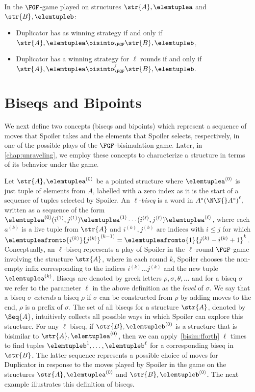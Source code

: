 \begin{corollary}
  In the $\FGF$-game played on structures $\str{A}, \elemtuplea$ and $\str{B}, \elemtupleb$:
  \begin{itemize}
    \item Duplicator has as winning strategy if and only if $\str{A}, \elemtuplea \bisimto_{\FGF} \str{B}, \elemtupleb$,
    \item Duplicator has a winning strategy for $\ell$ rounds if and only if $\str{A}, \elemtuplea \bisimto_{\FGF}^{\ell} \str{B}, \elemtupleb$.
  \end{itemize}
\end{corollary}

\section{Biseqs and Bipoints}\label{sec:biseqs-and-bipoints}
We next define two concepts (biseqs and bipoints) which represent a sequence of moves that Spoiler takes and the elements that Spoiler selects, respectively, in one of the possible plays of the $\FGF$-bisimulation game.
Later, in \cref{chap:unraveling}, we employ these concepts to characterize a structure in terms of its behavior under the game.

Let $\str{A}, \elemtuplea^{(0)}$ be a pointed structure where $\elemtuplea^{(0)}$ is just tuple of elements from $A$, labelled with a zero index as it is the start of a sequence of tuples selected by Spoiler.
An $\ell$-\emph{biseq} is a word in $A^*{(\N\N{}A^{*})}^{\ell}$, written as a sequence of the form $\elemtuplea^{(0)}(i^{(1)}, j^{(1)})\elemtuplea^{(1)}\cdots(i^{(\ell)}, j^{(\ell)})\elemtuplea^{(\ell)}$, where each $a^{(k)}$ is a live tuple from $\str{A}$ and $i^{(k)}, j^{(k)}$ are indices with $i \le j$ for which $\elemtupleafromto{i^{(k)}}{j^{(k)}}^{(k-1)} = \elemtupleafromto{1}{j^{(k)}-i^{(k)}+1}^{k}$.
Conceptually, an $\ell$-biseq represents a play of Spoiler in the $\ell$-round $\FGF$-game involving the structure $\str{A}$, where in each round $k$, Spoiler chooses the non-empty infix corresponding to the indices $i^{(k)}\ldots{}j^{(k)}$ and the new tuple $\elemtuplea^{(k)}$.
Biseqs are denoted by greek letters $\rho, \sigma, \theta, \ldots$ and for
a biseq $\sigma$ we refer to the parameter $\ell$ in the above definition as the \emph{level} of $\sigma$.
We say that a biseq $\sigma$ \emph{extends} a biseq $\rho$ if $\sigma$ can be constructed from $\rho$ by adding moves to the end, \ie{} $\rho$ is a prefix of $\sigma$.
The set of all biseqs for a structure $\str{A}$, denoted by $\Seq{A}$, intuitively collects all possible ways in which Spoiler can explore this structure.
For any $\ell$-biseq, if $\str{B}, \elemtupleb^{(0)}$ is a structure that is \FGF-bisimilar to $\str{A}, \elemtuplea^{(0)}$, then we can apply~\ref{bisim:fforth} $\ell$ times to find tuples $\elemtupleb^{1}, \ldots, \elemtupleb^{\ell}$ for a corresponding biseq in $\str{B}$.
The latter sequence represents a possible choice of moves for Duplicator in response to the moves played by Spoiler in the game on the structures $\str{A}, \elemtuplea^{(0)}$ and $\str{B}, \elemtupleb^{(0)}$.
The next example illustrates this definition of biseqs.


